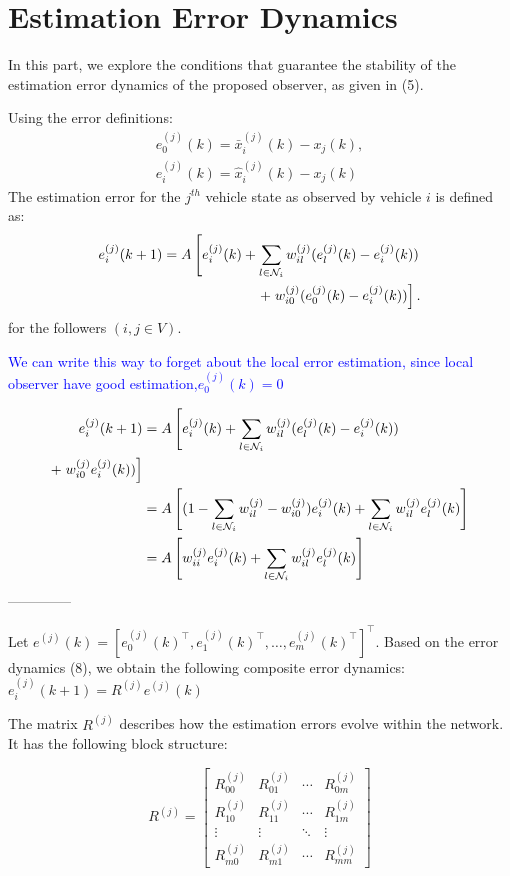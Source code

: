 \documentclass[letterpaper, 10pt, conference]{ieeeconf}  %
\begin{document}
\section{Estimation Error Dynamics}
In this part, we explore the conditions that guarantee the stability of the
estimation error dynamics of the proposed observer, as given in (5).

Using the error definitions:
\begin{align*}
e_0^{(j)}(k) = \bar{x}_i^{(j)}(k) - x_j(k),
\\
e_i^{(j)}(k) = \hat{x}_i^{(j)}(k) - x_j(k)
\end{align*}
The estimation error for the $j^{th}$ vehicle state as observed by vehicle $i$ is defined as:
\begin{align}
    e_i^{(j)}(k+1) = A\left[e_i^{(j)}(k) + \sum_{l \in \mathcal{N}_i} w_{il}^{(j)} (e_l^{(j)}(k) - e_i^{(j)}(k))\right. \notag \\
    +\left.  w_{i0}^{(j)}(e_0^{(j)}(k) - e_i^{(j)}(k))\right]. 
\end{align}
for the followers $( i, j \in V )$.


\textcolor{blue}{We can write this way to forget about the local error estimation, since local observer have good estimation,$e_0^{(j)}(k) = 0$ }

{\color{blue}
\begin{align}
    e_i^{(j)}(k+1) &= A\left[e_i^{(j)}(k) + \sum_{l \in \mathcal{N}_i} w_{il}^{(j)} (e_l^{(j)}(k) - e_i^{(j)}(k))\right. \notag \\
    +\left.  w_{i0}^{(j)} e_i^{(j)}(k))\right] \\ \notag 
    &= A\left[(1 - \sum_{l \in \mathcal{N}_i} w_{il}^{(j)} - w_{i0}^{(j)})e_i^{(j)}(k) + \sum_{l \in \mathcal{N}_i} w_{il}^{(j)} e_l^{(j)}(k)\right]\\ \notag
    &= A\left[ w_{ii}^{(j)}e_i^{(j)}(k) + \sum_{l \in \mathcal{N}_i} w_{il}^{(j)} e_l^{(j)}(k)\right]
\end{align}
--------------
}

Let $e^{(j)}(k)=\left[e_0^{(j)}(k)^{\top}, e_1^{(j)}(k)^{\top}, \ldots, e_m^{(j)}(k)^{\top}\right]^{\top}$. Based on the error dynamics (8), we obtain the following composite error dynamics:
$e_i^{(j)}(k+1) = R^{(j)} e^{(j)}(k) $

The matrix $R^{(j)}$ describes how the estimation errors evolve within the network. It has the following block structure:

$$
R^{(j)}=\left[\begin{array}{cccc}
R_{00}^{(j)} & R_{01}^{(j)} & \cdots & R_{0 m}^{(j)} \\
R_{10}^{(j)} & R_{11}^{(j)} & \cdots & R_{1 m}^{(j)} \\
\vdots & \vdots & \ddots & \vdots \\
R_{m 0}^{(j)} & R_{m 1}^{(j)} & \cdots & R_{m m}^{(j)}
\end{array}\right]
$$
\end{document}
